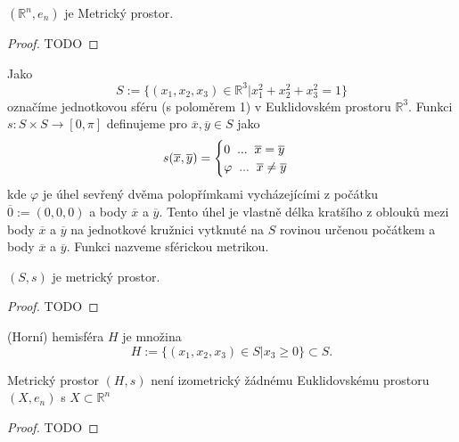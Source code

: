 \documentclass[../main.tex]{subfiles}
\begin{document}
\begin{lemma}[$(\mathbb{R}^n, e_n)$ je MP.]
    $(\mathbb{R}^n, e_n)$ je Metrický prostor.
\end{lemma}
\begin{proof}
    TODO
\end{proof}

\begin{example}
    Jako \[ S := \{ (x_1,x_2,x_3) \in \mathbb{R}^3 | x_1^2 + x_2^2 + x_3^2 = 1 \} \]
    označíme jednotkovou sféru (s poloměrem 1) v Euklidovském prostoru $\mathbb{R}^3$.
    Funkci $s: S \times S \to [0,\pi]$ definujeme pro $\overline{x}, \overline{y} \in S$ jako
    \[ s(\overline{x}, \overline{y}) =
    \begin{cases} 0 \hspace{2mm} ... \hspace{2mm} \overline{x} = \overline{y}\\ 
        \varphi \hspace{2mm} ... \hspace{2mm} \overline{x} \neq \overline{y}
    \end{cases} \]
    kde $\varphi$ je úhel sevřený dvěma polopřímkami vycházejícími z počátku $\overline{0} := (0,0,0)$
    a body $\overline{x}$ a $\overline{y}$. Tento úhel je vlastně délka kratšího z oblouků mezi body
    $\overline{x}$ a $\overline{y}$ na jednotkové kružnici vytknuté na $S$ rovinou určenou počátkem
    a body $\overline{x}$ a $\overline{y}$. Funkci nazveme sférickou metrikou.
\end{example}

\begin{lemma}
    $(S,s)$ je metrický prostor.
\end{lemma}
\begin{proof}
    TODO
\end{proof}

\begin{definition}
    (Horní) hemisféra $H$ je množina
    \[ H := \{ (x_1, x_2, x_3) \in S | x_3 \geq 0 \} \subset S. \]
\end{definition}

\begin{theorem}
    Metrický prostor $(H,s)$ není izometrický žádnému Euklidovskému prostoru
    $(X,e_n)$ s $X\subset \mathbb{R}^n$
\end{theorem}
\begin{proof}
    TODO
\end{proof}
\end{document}
